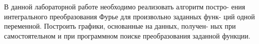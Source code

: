 \documentclass[a4paper, 14pt, titlepage, fleqn]{extarticle}
\begin{document}
	\setcounter{page}{2}
	\tableofcontents
	\setlength{\baselineskip}{25pt}
	\newpage

	\onehalfspacing



		В данной лабораторной работе необходимо реализовать алгоритм постро-
        ения интегрального преобразования Фурье для произвольно заданных функ-
        ций одной переменной. Построить графики, основанные на данных, получен-
        ных при самостоятельном и при программном поиске преобразования заданной
        функции.
	\pagebreak
\end{document}
